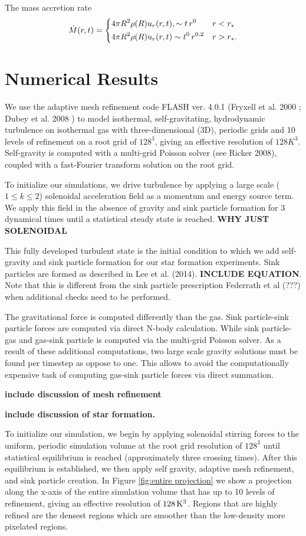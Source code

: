 \documentclass{emulateapj}
\newcommand{\be}{\begin{equation}}
\newcommand{\ee}{\end{equation}}
\begin{document}
The mass accretion rate 
%
\be
\dot M(r,t)=
\begin{dcases}
4\pi R^2\rho(R)u_r(r,t), \sim t\,r^{0} & r<r_*\\
4\pi R^2\rho(R)u_r(r,t) \sim t^0\,r^{0.2} & r>r_*.
\end{dcases}
\ee
%


\section{Numerical Results}

We use the adaptive mesh refinement code FLASH ver. 4.0.1 (Fryxell et al.
2000
; Dubey
et al.
2008
) to model isothermal, self-gravitating, hydrodynamic turbulence on isothermal gas with three-dimensional (3D),
periodic grids and 10 levels of refinement on a root grid of $128^3$, giving an effective resolution of $128K^3$.  
Self-gravity is computed with a multi-grid Poisson solver (see Ricker
2008), coupled with a fast-Fourier transform solution on the root grid.

To initialize our simulations, we drive turbulence by applying a large scale ($1 \le k \le 2$) solenoidal 
acceleration field as a momentum and energy source term.  We apply this field in the absence of gravity and sink particle formation for 3 dynamical times until a statistical steady state is reached.
{\bf WHY JUST SOLENOIDAL}

This fully developed turbulent state is the initial condition to which we add self-gravity and sink particle formation for
our star formation experiments. Sink particles are formed as described in Lee et al. (2014). {\bf INCLUDE EQUATION}.  Note that this is different from the sink particle prescription Federrath et al (???) when additional checks need to be performed.

The gravitational force is computed differently than the gas. Sink particle-sink particle forces are computed via direct N-body calculation. While sink particle-gas and gas-sink particle is computed via the multi-grid Poisson solver.  As a result of these additional computations, two large scale gravity solutions must be found per timestep as oppose to one.  This allows to avoid the computationally expensive task of computing gas-sink particle forces via direct summation. 

{\bf include discussion of mesh refinement}

{\bf include discussion of star formation.}

To initialize our simulation, we begin by applying solenoidal stirring forces to the uniform, periodic simulation volume at the root grid resolution of $128^3$ until statistical equilibrium is reached (approximately three crossing times).  After this equilibrium is established, we then apply self gravity, adaptive mesh refinement, and sink particle creation.  In Figure \ref{fig:entire projection} we show a projection along the x-axis of the entire simulation volume that has up to 10 levels of refinement, giving an effective resolution of $128\,{\rm K}^3$. Regions that are highly refined are the densest regions which are smoother than the low-density more pixelated regions.
\end{document}
